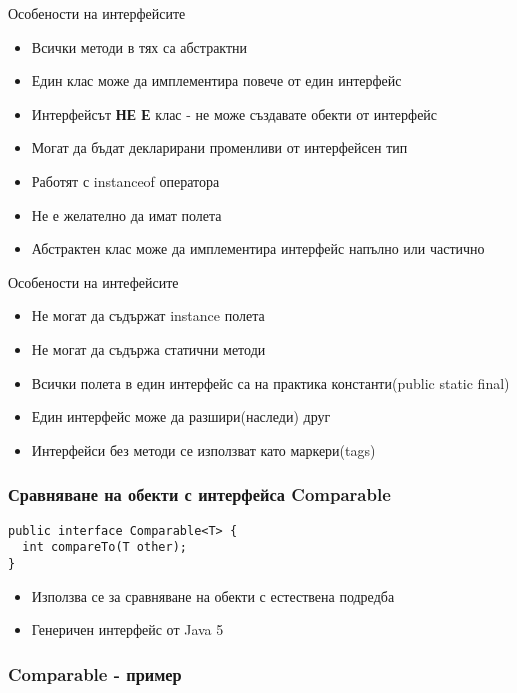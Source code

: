 \documentclass{beamer}
\begin{document}
\begin{frame}{Особености на интерфейсите}
  \transdissolve
  \begin{itemize}
  \item Всички методи в тях са абстрактни
  \item Един клас може да имплементира повече от един интерфейс
  \item Интерфейсът \textbf{НЕ Е} клас - не може създавате обекти от
    интерфейс
  \item Могат да бъдат декларирани променливи от интерфейсен тип
  \item Работят с instanceof оператора
  \item Не е желателно да имат полета
  \item Абстрактен клас може да имплементира интерфейс напълно или
    частично
  \end{itemize}
\end{frame}

\begin{frame}{Особености на интефейсите}
  \transdissolve
  \begin{itemize}
  \item Не могат да съдържат instance полета
  \item Не могат да съдържа статични методи
  \item Всички полета в един интерфейс са на практика константи(public
    static final)
  \item Един интерфейс може да разшири(наследи) друг
  \item Интерфейси без методи се използват като маркери(tags)
  \end{itemize}
\end{frame}

\begin{frame}[fragile]
\frametitle{Сравняване на обекти с интерфейса Comparable}
\transdissolve
\begin{lstlisting}
public interface Comparable<T> {
  int compareTo(T other);
}
\end{lstlisting}
\begin{itemize}
  \item Използва се за сравняване на обекти с естествена подредба
  \item Генеричен интерфейс от Java 5
\end{itemize}

\end{frame}

\begin{frame}[fragile]
  \frametitle{Comparable - пример}
  \transdissolve
\begin{lstlisting}
  
\end{lstlisting}
\end{frame}
\end{document}
